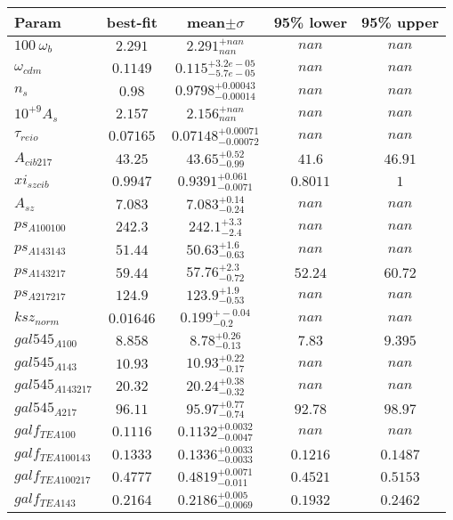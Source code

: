 \begin{tabular}{|l|c|c|c|c|} 
 \hline 
Param & best-fit & mean$\pm\sigma$ & 95\% lower & 95\% upper \\ \hline 
$100~\omega{}_{b }$ &$2.291$ & $2.291_{nan}^{+nan}$ & $nan$ & $nan$ \\ 
$\omega{}_{cdm }$ &$0.1149$ & $0.115_{-5.7e-05}^{+3.2e-05}$ & $nan$ & $nan$ \\ 
$n_{s }$ &$0.98$ & $0.9798_{-0.00014}^{+0.00043}$ & $nan$ & $nan$ \\ 
$10^{+9}A_{s }$ &$2.157$ & $2.156_{nan}^{+nan}$ & $nan$ & $nan$ \\ 
$\tau{}_{reio }$ &$0.07165$ & $0.07148_{-0.00072}^{+0.00071}$ & $nan$ & $nan$ \\ 
$A_{cib 217 }$ &$43.25$ & $43.65_{-0.99}^{+0.52}$ & $41.6$ & $46.91$ \\ 
$xi_{sz cib }$ &$0.9947$ & $0.9391_{-0.0071}^{+0.061}$ & $0.8011$ & $1$ \\ 
$A_{sz }$ &$7.083$ & $7.083_{-0.24}^{+0.14}$ & $nan$ & $nan$ \\ 
$ps_{A 100 100 }$ &$242.3$ & $242.1_{-2.4}^{+3.3}$ & $nan$ & $nan$ \\ 
$ps_{A 143 143 }$ &$51.44$ & $50.63_{-0.63}^{+1.6}$ & $nan$ & $nan$ \\ 
$ps_{A 143 217 }$ &$59.44$ & $57.76_{-0.72}^{+2.3}$ & $52.24$ & $60.72$ \\ 
$ps_{A 217 217 }$ &$124.9$ & $123.9_{-0.53}^{+1.9}$ & $nan$ & $nan$ \\ 
$ksz_{norm }$ &$0.01646$ & $0.199_{-0.2}^{+-0.04}$ & $nan$ & $nan$ \\ 
$gal545_{A 100 }$ &$8.858$ & $8.78_{-0.13}^{+0.26}$ & $7.83$ & $9.395$ \\ 
$gal545_{A 143 }$ &$10.93$ & $10.93_{-0.17}^{+0.22}$ & $nan$ & $nan$ \\ 
$gal545_{A 143 217 }$ &$20.32$ & $20.24_{-0.32}^{+0.38}$ & $nan$ & $nan$ \\ 
$gal545_{A 217 }$ &$96.11$ & $95.97_{-0.74}^{+0.77}$ & $92.78$ & $98.97$ \\ 
$galf_{TE A 100 }$ &$0.1116$ & $0.1132_{-0.0047}^{+0.0032}$ & $nan$ & $nan$ \\ 
$galf_{TE A 100 143 }$ &$0.1333$ & $0.1336_{-0.0033}^{+0.0033}$ & $0.1216$ & $0.1487$ \\ 
$galf_{TE A 100 217 }$ &$0.4777$ & $0.4819_{-0.011}^{+0.0071}$ & $0.4521$ & $0.5153$ \\ 
$galf_{TE A 143 }$ &$0.2164$ & $0.2186_{-0.0069}^{+0.005}$ & $0.1932$ & $0.2462$ \\ 

\end{tabular}
